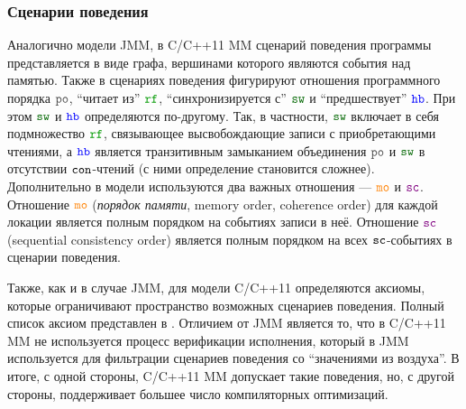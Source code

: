 
\subsubsection{Сценарии поведения}
Аналогично модели JMM, в C/C++11 MM сценарий поведения программы представляется в виде графа,
вершинами которого являются события над памятью.
Также в сценариях поведения фигурируют
отношения программного порядка $\lPO$, ``читает из'' $\lRF$, ``синхронизируется с'' $\lSW$
и ``предшествует'' $\lHB$.
При этом $\lSW$ и $\lHB$ определяются по-другому.
Так, в частности, $\lSW$ включает в себя подмножество $\lRF$,
связывающее высвобождающие записи с приобретающими чтениями, а $\lHB$ является транзитивным замыканием объединения
$\lPO$ и $\lSW$ в отсутствии ${\mathtt{con}}$-чтений (с ними определение становится сложнее).
Дополнительно в модели используются два важных отношения --- $\lMO$ и $\lSC$.
Отношение $\lMO$ (\emph{порядок памяти}, memory order, coherence order)
для каждой локации является полным порядком на событиях записи в неё.
Отношение $\lSC$ (sequential consistency order) является полным порядком
на всех ${\mathtt{sc}}$-событиях в сценарии поведения.

Также, как и в случае JMM, для модели C/C++11 определяются аксиомы, которые ограничивают пространство возможных сценариев поведения.
Полный список аксиом представлен в \cite{Batty-al:POPL11, Vafeiadis-Narayan:OOPSLA13}.
Отличием от JMM является то, что в C/C++11 MM не используется процесс верификации исполнения, который в JMM
используется для фильтрации сценариев поведения со ``значениями из воздуха''.
В итоге, с одной стороны, C/C++11 MM допускает такие поведения, но, с другой стороны, поддерживает большее число
компиляторных оптимизаций.

